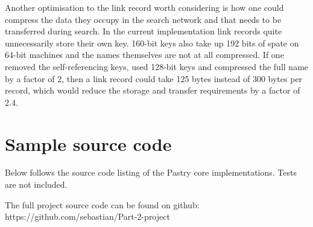 \mbox{}

Another optimisation to the link record worth considering is how one could compress the data they occupy in the search network and that needs to be transferred during search.
In the current implementation link records quite unnecessarily store their own key. 160-bit keys also take up 192 bits of spate on 64-bit machines and the names themselves are not at all compressed.
If one removed the self-referencing keys, used 128-bit keys and compressed the full name by a factor of 2, then a link record could take 125 bytes instead of 300 bytes per record, which would reduce the storage and transfer requirements by a factor of 2.4. 


\chapter{Sample source code}
Below follows the source code listing of the Pastry core implementations.
Tests are not included.

The full project source code can be found on github: https://github.com/sebastian/Part-2-project


